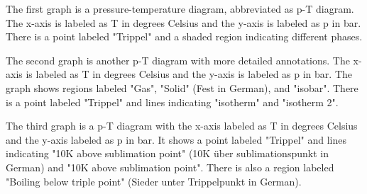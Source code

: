 The first graph is a pressure-temperature diagram, abbreviated as p-T diagram. The x-axis is labeled as T in degrees Celsius and the y-axis is labeled as p in bar. There is a point labeled "Trippel" and a shaded region indicating different phases.

The second graph is another p-T diagram with more detailed annotations. The x-axis is labeled as T in degrees Celsius and the y-axis is labeled as p in bar. The graph shows regions labeled "Gas", "Solid" (Fest in German), and "isobar". There is a point labeled "Trippel" and lines indicating "isotherm" and "isotherm 2".

The third graph is a p-T diagram with the x-axis labeled as T in degrees Celsius and the y-axis labeled as p in bar. It shows a point labeled "Trippel" and lines indicating "10K above sublimation point" (10K über sublimationspunkt in German) and "10K above sublimation point". There is also a region labeled "Boiling below triple point" (Sieder unter Trippelpunkt in German).